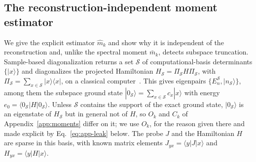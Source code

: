 \documentclass[submission, PhysCore]{SciPost}
\begin{document}
\begin{appendix}
\section{The reconstruction-independent moment estimator}
\label{app:estimator}
We give the explicit estimator $\widehat{m}_k$ and show why it is independent of the reconstruction and, unlike the spectral moment $\bar m_k$, detects subspace truncation. Sample-based diagonalization returns a set $\mathcal{S}$ of computational-basis determinants $\{|x\rangle\}$ and diagonalizes the projected Hamiltonian $H_\mathcal{S}=\Pi_\mathcal{S} H\Pi_\mathcal{S}$, with $\Pi_\mathcal{S}=\sum_{x\in\mathcal{S}}|x\rangle\langle x|$, on a classical computer~\cite{SQDchem2025,QSCI2023}. This gives eigenpairs $\{E_n^{\mathcal{S}},|n_{\mathcal{S}}\rangle\}$, among them the subspace ground state $|0_\mathcal{S}\rangle=\sum_{x\in\mathcal{S}}c_x|x\rangle$ with energy ${e_0=\langle 0_\mathcal{S}|H|0_\mathcal{S}\rangle}$. Unless $\mathcal{S}$ contains the support of the exact ground state, $|0_\mathcal{S}\rangle$ is an eigenstate of $H_\mathcal{S}$ but in general not of $H$, so $O_k$ and $C_k$ of Appendix~\ref{app:moments} differ on it; we use $O_k$, for the reason given there and made explicit by Eq.~\eqref{eq:app-leak} below. The probe $J$ and the Hamiltonian $H$ are sparse in this basis, with known matrix elements $J_{yx}=\langle y|J|x\rangle$ and $H_{yx}=\langle y|H|x\rangle$.


\end{appendix}
\end{document}
